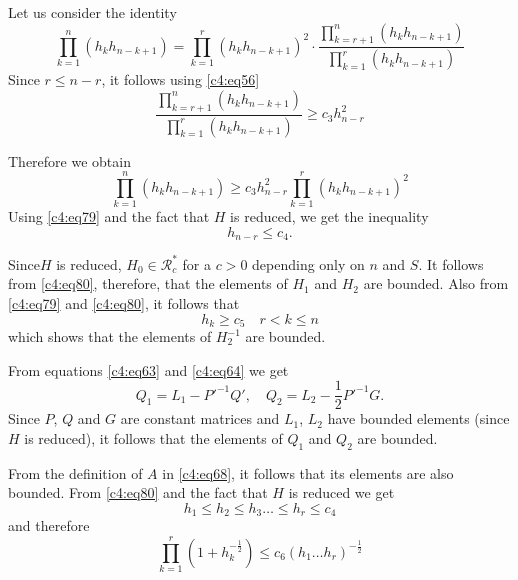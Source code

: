 Let us consider the identity
$$
\prod^{n}_{k=1}(h_{k}h_{n-k+1})=\prod^{r}_{k=1}(h_{k}h_{n-k+1})^{2}\cdot \frac{\prod\limits_{k=r+1}^{n}(h_{k}h_{n-k+1})}{\prod\limits^{r}_{k=1}(h_{k}h_{n-k+1})}
$$
Since $r\leq n-r$, it follows using \eqref{c4:eq56}
$$
\frac{\prod\limits^{n}_{k=r+1}(h_{k}h_{n-k+1})}{\prod\limits_{k=1}^{r}(h_{k}h_{n-k+1})}\geq c_{3}h^{2}_{n-r}
$$

Therefore we obtain
$$
\prod^{n}_{k=1}(h_{k}h_{n-k+1})\geq
c_{3}h^{2}_{n-r}\prod^{r}_{k=1}(h_{k}h_{n-k+1})^{2} 
$$
Using \eqref{c4:eq79} and the fact that $H$ is reduced, we get the
inequality
\begin{equation*}
h_{n-r}\leq c_{4}.\tag{80}\label{c4:eq80}
\end{equation*}

Since\pageoriginale $H$ is reduced, $H_{0}\in\mathscr{R}^{\ast}_{c}$
for a $c>0$ depending only on $n$ and $S$. It follows from \eqref{c4:eq80},
therefore, that the elements of $H_{1}$ and $H_{2}$ are bounded. Also
from \eqref{c4:eq79} and \eqref{c4:eq80}, it follows that
\begin{equation*}
h_{k}\geq c_{5}\quad r<k\leq n\tag{81}\label{c4:eq81}
\end{equation*}
which shows that the elements of $H^{-1}_{2}$ are bounded.

From equations \eqref{c4:eq63} and \eqref{c4:eq64} we get
$$
Q_{1}=L_{1}-{P'}^{-1}Q',\quad Q_{2}=L_{2}-\frac{1}{2}{P'}^{-1}G.
$$
Since $P$, $Q$ and $G$ are constant matrices and $L_{1}$, $L_{2}$ have
bounded elements (since $H$ is reduced), it follows that the elements
of $Q_{1}$ and $Q_{2}$ are bounded.

From the definition of $A$ in \eqref{c4:eq68}, it follows that its elements
are also bounded. From \eqref{c4:eq80} and the fact that $H$ is reduced we
get
\begin{equation*}
h_{1}\leq h_{2}\leq h_{3}\ldots\leq h_{r}\leq c_{4}\tag{82}\label{c4:eq82}
\end{equation*}
and therefore
\begin{equation*}
\prod^{r}_{k=1}(1+h^{-\frac{1}{2}}_{k})\leq c_{6}(h_{1}\ldots
h_{r})^{-\frac{1}{2}}\tag{83}\label{c4:eq83} 
\end{equation*}

